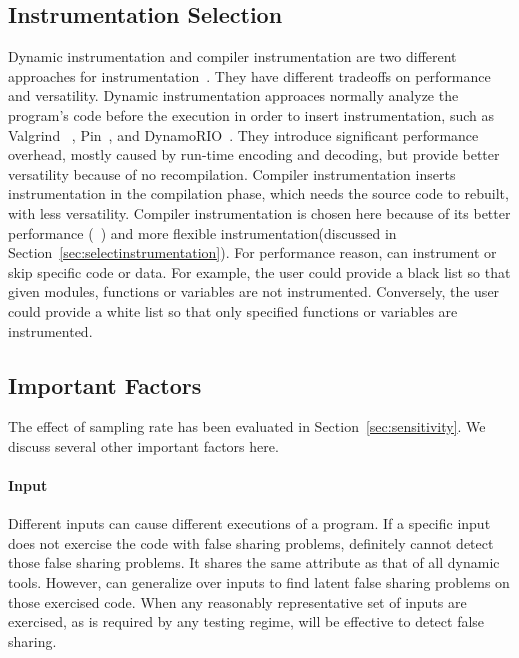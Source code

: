 \label{sec:discussion}

\subsection{Instrumentation Selection}
\label{sec:instrumentationtradeoff}
Dynamic instrumentation and compiler instrumentation are two different approaches for instrumentation~\cite{Instrumentation}. They have different tradeoffs on performance and versatility. Dynamic instrumentation approaces normally analyze the program's code before the execution in order to insert instrumentation, such as Valgrind ~\cite{Valgrind}, Pin~\cite{Pin}, and DynamoRIO~\cite{DynamoRIO}. They introduce significant performance overhead, mostly caused by run-time encoding and decoding, but provide better versatility because of no recompilation. Compiler instrumentation inserts instrumentation in the compilation phase, which needs the source code to rebuilt, with less versatility. 
Compiler instrumentation is chosen here because of its better performance (~\cite{Instrumentation}) and more flexible instrumentation(discussed in Section~\ref{sec:selectinstrumentation}). For performance reason, \Predator{} can instrument or skip specific code or data. For example, the user could provide a black list so that given modules, functions or variables are not instrumented. Conversely, the user could provide a white list so that only specified functions or variables are instrumented.

\subsection{Important Factors}
The effect of sampling rate has been evaluated in Section~\ref{sec:sensitivity}.  We discuss several other important factors here. 

\paragraph{Input} Different inputs can cause different executions of a program. If a specific input does not exercise the code with false sharing problems, \Predator{} definitely cannot detect those false sharing problems. It shares the same attribute as that of all dynamic tools. However, \Predator{} can generalize over inputs to find latent false sharing problems on those exercised code. When any reasonably representative set of inputs are exercised, as is required by any testing regime, \Predator{} will be effective to detect false sharing.

